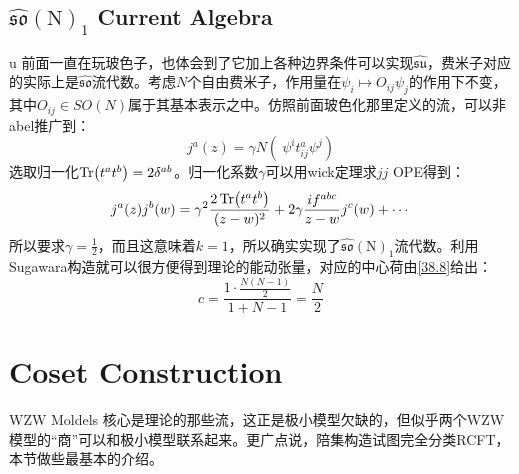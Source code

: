 \subsection{$\widehat{\mathfrak{so}}(\mathrm{N})_1$ Current Algebra}u
前面一直在玩玻色子，也体会到了它加上各种边界条件可以实现$\widehat{\mathfrak{su}}$，费米子对应的实际上是$\widehat{\mathfrak{so}}$流代数。考虑$N$个自由费米子，作用量在$\psi_i\mapsto O_{ij}\psi_j$的作用下不变，其中$O_{ij}\in SO(N)$属于其基本表示之中。仿照前面玻色化那里定义的流，可以非abel推广到：
\begin{equation}
	j^a(z)=\gamma N(\mathrm{~}\psi^it_{ij}^a\psi^j)
\end{equation}
选取归一化$\Tr(t^a t^b)=2\delta^{ab}$。归一化系数$\gamma$可以用wick定理求$jj$ OPE得到：
\begin{equation}
	j^a(z)j^b(w)=\gamma^2\frac{2\Tr (t^at^b)}{(z-w)^2}+2\gamma\frac{if^{abc}}{z-w}j^c(w)+\cdots
\end{equation}
所以要求$\gamma =\frac{1}{2}$，而且这意味着$k=1$，所以确实实现了$\widehat{\mathfrak{so}}(\mathrm{N})_1$流代数。利用Sugawara构造就可以很方便得到理论的能动张量，对应的中心荷由\ref{38.8}给出：
\begin{equation}
	c=\frac{1\cdot \frac{N(N-1)}{2}}{1+N-1}=\frac{N}{2}
\end{equation}
\section{Coset Construction}
WZW Moldels 核心是理论的那些流，这正是极小模型欠缺的，但似乎两个WZW模型的“商”可以和极小模型联系起来。更广点说，陪集构造试图完全分类RCFT，本节做些最基本的介绍。

